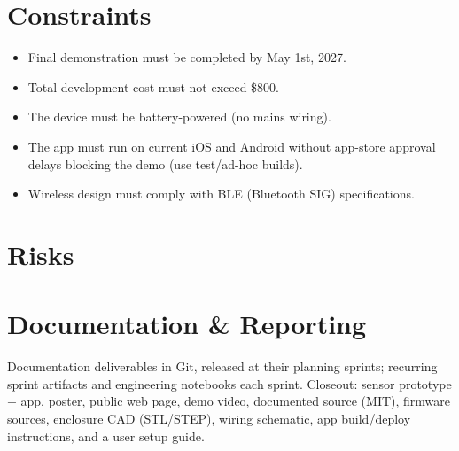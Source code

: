 \documentclass[11pt,letterpaper]{article}
\begin{document}
\section{Constraints}
\begin{itemize}
  \item Final demonstration must be completed by May 1st, 2027.
  \item Total development cost must not exceed \$800.
  \item The device must be battery-powered (no mains wiring).
  \item The app must run on current iOS and Android without app-store approval delays blocking the demo (use test/ad-hoc builds).
  \item Wireless design must comply with BLE (Bluetooth SIG) specifications.
\end{itemize}

\section{Risks}
\begin{table}[h]
\caption{Highest-exposure project risks}
\end{table}

\section{Documentation \& Reporting}
Documentation deliverables in Git, released at their planning sprints; recurring
sprint artifacts and engineering notebooks each sprint. Closeout: sensor prototype +
app, poster, public web page, demo video, documented source (MIT), firmware
sources, enclosure CAD (STL/STEP), wiring schematic, app build/deploy instructions,
and a user setup guide.


{}
\end{document}
